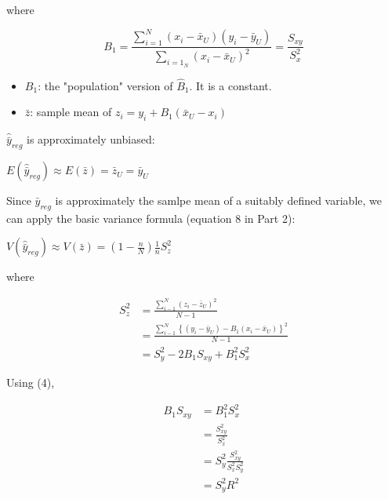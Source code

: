 \documentclass[10pt,landscape]{article}
\begin{document}
\begin{multicols}{3}
where

\begin{equation}
  B_{1} = \frac{\sum_{i=1}^{N}(x_{i}-\bar{x}_{U})(y_{i}-\bar{y}_{U})}{\sum_{i=1}_{N}(x_{i}-\bar{x}_{U})^{2}}
  = \frac{S_{xy}}{S_{x}^{2}}
\end{equation}

\begin{itemize}
  \item $B_{1}$: the "population" version of $\hat{B}_{1}$. It is a constant.
  \item $\bar{z}$: sample mean of $z_{i} = y_{i} + B_{1}(\bar{x}_{U} - x_{i})$
\end{itemize}

$\hat{\bar{y}}_{reg}$ is approximately unbiased:
\begin{center}
  $E(\hat{\bar{y}}_{reg}) \approx E(\bar{z}) = \bar{z}_{U} = \bar{y}_{U}$
\end{center}

Since $\hat{\bar{y}}_{reg}$ is approximately the samlpe mean of a suitably defined variable, we can apply the basic variance formula (equation 8 in Part 2):

\begin{center}
  $V(\hat{\bar{y}}_{reg}) \approx V(\bar{z}) = (1-\frac{n}{N})\frac{1}{n}S_{z}^{2}$
\end{center}

where

\begin{equation}
  \begin{split}
    S_{z}^{2} &= \frac{\sum^{N}_{i-1}(z_{i}-\bar{z}_{U})^{2}}{N-1} \\
    &= \frac{\sum^{N}_{i-1}\left\{(y_{i}-\bar{y}_{U}) - B_{1}(x_{i}-\bar{x}_{U})\right\}^{2}}{N-1} \\
    &= S_{y}^{2} - 2B_{1}S_{xy} + B_{1}^{2}S_{x}^{2}
  \end{split}
\end{equation}

Using (4),

\begin{equation}
  \begin{split}
    B_{1}S_{xy} &= B_{1}^{2}S_{x}^{2} \\
    &= \frac{S_{xy}^{2}}{S_{x}^{2}} \\
    &= S_{y}^{2}\frac{S_{xy}^{2}}{S_{x}^{2}S_{y}^{2}} \\
    &= S_{y}^{2}R^{2}
  \end{split}
\end{equation}


\end{multicols}
\end{document}
